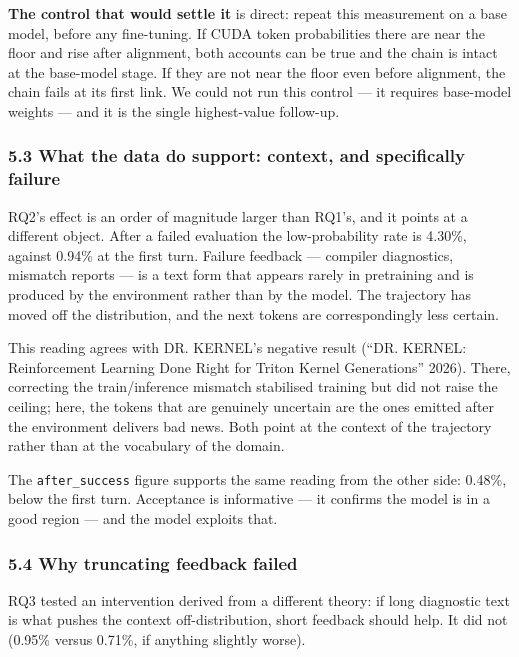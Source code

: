 \documentclass[
  11pt,
]{article}
\begin{document}
\textbf{The control that would settle it} is direct: repeat this
measurement on a base model, before any fine-tuning. If CUDA token
probabilities there are near the floor and rise after alignment, both
accounts can be true and the chain is intact at the base-model stage. If
they are not near the floor even before alignment, the chain fails at
its first link. We could not run this control --- it requires base-model
weights --- and it is the single highest-value follow-up.

\hypertarget{what-the-data-do-support-context-and-specifically-failure}{%
\subsubsection{5.3 What the data do support: context, and specifically
failure}\label{what-the-data-do-support-context-and-specifically-failure}}

RQ2's effect is an order of magnitude larger than RQ1's, and it points
at a different object. After a failed evaluation the low-probability
rate is 4.30\%, against 0.94\% at the first turn. Failure feedback ---
compiler diagnostics, mismatch reports --- is a text form that appears
rarely in pretraining and is produced by the environment rather than by
the model. The trajectory has moved off the distribution, and the next
tokens are correspondingly less certain.

This reading agrees with DR. KERNEL's negative result ({``{DR. KERNEL}:
Reinforcement Learning Done Right for {Triton} Kernel Generations''}
2026). There, correcting the train/inference mismatch stabilised
training but did not raise the ceiling; here, the tokens that are
genuinely uncertain are the ones emitted after the environment delivers
bad news. Both point at the context of the trajectory rather than at the
vocabulary of the domain.

The \texttt{after\_success} figure supports the same reading from the
other side: 0.48\%, below the first turn. Acceptance is informative ---
it confirms the model is in a good region --- and the model exploits
that.

\hypertarget{why-truncating-feedback-failed}{%
\subsubsection{5.4 Why truncating feedback
failed}\label{why-truncating-feedback-failed}}

RQ3 tested an intervention derived from a different theory: if long
diagnostic text is what pushes the context off-distribution, short
feedback should help. It did not (0.95\% versus 0.71\%, if anything
slightly worse).
\end{document}
